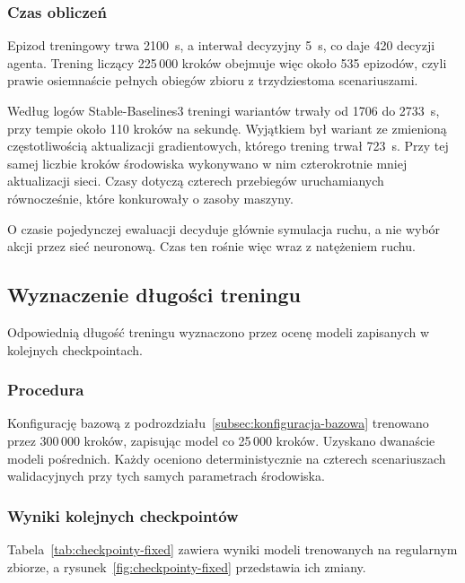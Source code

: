 \subsubsection{Czas obliczeń}
\label{subsubsec:czas-obliczen}

Epizod treningowy trwa 2100~s, a interwał decyzyjny 5~s, co daje 420 decyzji agenta. Trening liczący 225\,000 kroków obejmuje więc około 535 epizodów, czyli prawie osiemnaście pełnych obiegów zbioru z trzydziestoma scenariuszami.

Według logów Stable-Baselines3 treningi wariantów trwały od 1706 do 2733~s, przy tempie około 110 kroków na sekundę. Wyjątkiem był wariant ze zmienioną częstotliwością aktualizacji gradientowych, którego trening trwał 723~s. Przy tej samej liczbie kroków środowiska wykonywano w nim czterokrotnie mniej aktualizacji sieci. Czasy dotyczą czterech przebiegów uruchamianych równocześnie, które konkurowały o zasoby maszyny.

O czasie pojedynczej ewaluacji decyduje głównie symulacja ruchu, a nie wybór akcji przez sieć neuronową. Czas ten rośnie więc wraz z natężeniem ruchu.

\subsection{Wyznaczenie długości treningu}
\label{subsec:dlugosc-treningu}

Odpowiednią długość treningu wyznaczono przez ocenę modeli zapisanych w kolejnych checkpointach.

\subsubsection{Procedura}
\label{subsubsec:procedura-checkpointy}

Konfigurację bazową z podrozdziału~\ref{subsec:konfiguracja-bazowa} trenowano przez 300\,000 kroków, zapisując model co 25\,000 kroków. Uzyskano dwanaście modeli pośrednich. Każdy oceniono deterministycznie na czterech scenariuszach walidacyjnych przy tych samych parametrach środowiska.

\subsubsection{Wyniki kolejnych checkpointów}
\label{subsubsec:wyniki-checkpointy}

Tabela~\ref{tab:checkpointy-fixed} zawiera wyniki modeli trenowanych na regularnym zbiorze, a rysunek~\ref{fig:checkpointy-fixed} przedstawia ich zmiany.

